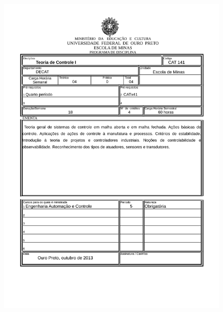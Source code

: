 \begin{figure}[p]
	\centering 
	\includegraphics[scale=0.7]{capitulos/anexo1-programas-disciplina/p53.pdf}
\end{figure}

